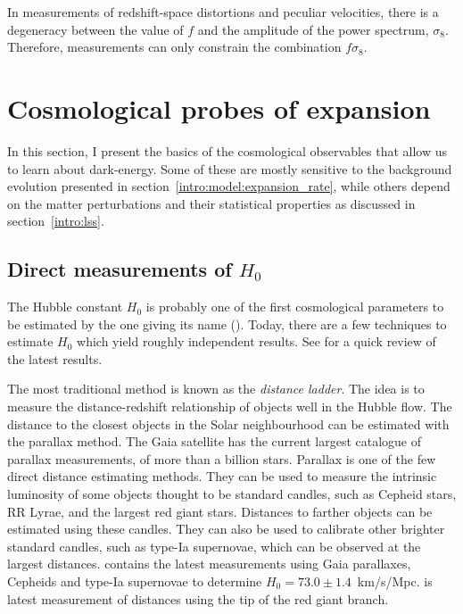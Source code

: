     In measurements of redshift-space distortions and peculiar velocities, 
    there is a degeneracy between the value of $f$ and the
    amplitude of the power spectrum, $\sigma_8$. Therefore, 
    measurements can only constrain the combination $f\sigma_8$. 



    

\section{Cosmological probes of expansion}
\label{intro:probes}

    In this section, I present the basics of the cosmological 
    observables that allow us to learn about dark-energy. 
    Some of these are mostly sensitive to the background evolution
    presented in section~\ref{intro:model:expansion_rate}, while others 
    depend on the matter perturbations and their statistical properties as 
    discussed in section~\ref{intro:lss}. 

    \subsection{Direct measurements of \texorpdfstring{$H_0$}{the Hubble constant}}
    \label{intro:probes:h0}

    The Hubble constant $H_0$ is probably one of the first cosmological parameters 
    to be estimated by the one giving its name (\cite{hubbleRelationDistanceRadial1929}).
    Today, there are a few techniques to estimate $H_0$ which yield roughly independent results.
    See \cite{riessExpansionUniverseFaster2020} for a quick review of the latest results.  

    The most traditional method is known as the \emph{distance ladder}. 
    The idea is to measure the distance-redshift relationship of objects 
    well in the Hubble flow. 
    The distance to the closest objects in the Solar neighbourhood can 
    be estimated with the parallax method. The Gaia satellite has the current largest catalogue 
    of parallax measurements, of more than a billion stars. 
    Parallax is one of the few direct distance estimating methods. They can be used to 
    measure the intrinsic luminosity of some objects thought to be standard candles, such as 
    Cepheid stars, RR Lyrae, and the largest red giant stars. 
    Distances to farther objects can be estimated using these candles. They can also
    be used to calibrate other brighter standard candles, such as type-Ia supernovae, which 
    can be observed at the largest distances. 
    \cite{riessCosmicDistancesCalibrated2021a} contains the latest measurements using 
    Gaia parallaxes, Cepheids and type-Ia supernovae 
    to determine $H_0 = 73.0 \pm 1.4$~km/s/Mpc.  
    \cite{freedmanCarnegieChicagoHubbleProgram2019}
    is latest measurement of distances using the tip of the red giant branch. 
    
